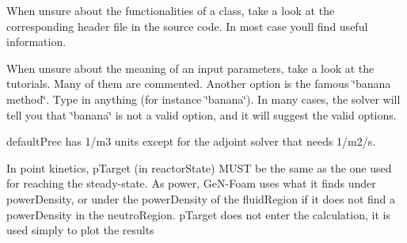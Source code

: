 
\begin{DoxyItemize}
\item When unsure about the functionalities of a class, take a look at the corresponding header file in the source code. In most case you\textquotesingle{}ll find useful information.
\item When unsure about the meaning of an input parameters, take a look at the tutorials. Many of them are commented. Another option is the famous \char`\"{}banana method\char`\"{}. Type in anything (for instance \char`\"{}banana\char`\"{}). In many cases, the solver will tell you that \char`\"{}banana\char`\"{} is not a valid option, and it will suggest the valid options.
\item default\+Prec has 1/m3 units except for the adjoint solver that needs 1/m2/s.
\item In point kinetics, p\+Target (in reactor\+State) M\+U\+ST be the same as the one used for reaching the steady-\/state. As power, Ge\+N-\/\+Foam uses what it finds under power\+Density, or under the power\+Density of the fluid\+Region if it does not find a power\+Density in the neutro\+Region. p\+Target does not enter the calculation, it is used simply to plot the results 
\end{DoxyItemize}